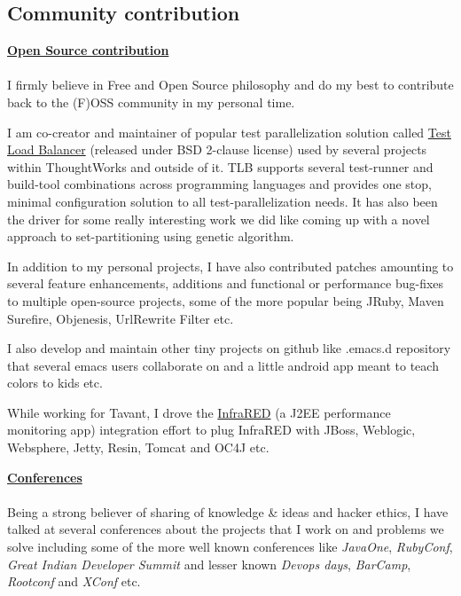 \documentclass[margin,line]{res}
\begin{document}
\begin{resume}
\section{\sc Community contribution}
{\underline {\bf Open Source contribution}}\\
\vspace{-.2cm}\\
I firmly believe in Free and Open Source philosophy and do my best to contribute back to the (F)OSS community in my personal time.

I am co-creator and maintainer of popular test parallelization solution called \href{http://test-load-balancer.github.com}{Test Load Balancer} (released under BSD 2-clause license) used by several projects within ThoughtWorks and outside of it. 
TLB supports several test-runner and build-tool combinations across programming languages and provides one stop, minimal configuration solution to all test-parallelization needs. 
It has also been the driver for some really interesting work we did like coming up with a novel approach to set-partitioning using genetic algorithm.

In addition to my personal projects, I have also contributed patches amounting to several feature enhancements, additions and functional or performance bug-fixes to multiple open-source projects, some of the more popular being JRuby, Maven Surefire, Objenesis, UrlRewrite Filter etc.

I also develop and maintain other tiny projects on github like .emacs.d repository that several emacs users collaborate on and a little android app meant to teach colors to kids etc.

While working for Tavant, I drove the \href{http://sourceforge.net/projects/infrared}{InfraRED} (a J2EE performance monitoring app) integration effort to plug InfraRED with JBoss, Weblogic, Websphere, Jetty, Resin, Tomcat and OC4J etc.

{\underline {\bf Conferences}}\\
\vspace{-.2cm}\\
Being a strong believer of sharing of knowledge \& ideas and hacker ethics, I have talked at several conferences about the projects that I work on and problems we solve including some of the more well known conferences like {\em JavaOne}, {\em RubyConf}, {\em Great Indian Developer Summit} and lesser known {\em Devops days}, {\em BarCamp}, {\em Rootconf} and {\em XConf} etc.\\


\end{resume}
\end{document}
